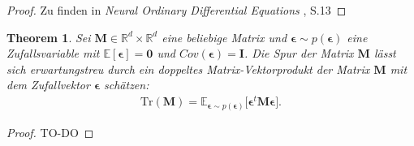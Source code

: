 \documentclass[12pt]{article}
\newcommand{\E}{\mathbb{E}}
\newtheorem{theorem}{Theorem}
\begin{document}
	\begin{proof}
	Zu finden in \emph{Neural Ordinary Differential Equations} \cite{neuralode}, S.13
	\end{proof}
		\begin{theorem}%
		Sei $\mathbf{M}\in \mathbb{R}^d \times \mathbb{R}^d$ eine beliebige Matrix und $\boldsymbol\epsilon \sim p(\boldsymbol\epsilon)$ eine Zufallsvariable mit $\E[\boldsymbol\epsilon] = \mathbf{0}$ und $Cov(\boldsymbol\epsilon) =\mathbf{I}$. Die Spur der Matrix $\mathbf{M}$ lässt sich erwartungstreu durch ein doppeltes Matrix-Vektorprodukt der Matrix  $\mathbf{M}$ mit dem Zufallvektor $\boldsymbol\epsilon$ schätzen:
		\begin{align*}
		\mathrm{Tr}(\mathbf{M}) = 
		\E_{\boldsymbol\epsilon \sim p(\boldsymbol\epsilon)}\big[\boldsymbol\epsilon^t \mathbf{M} \boldsymbol\epsilon \big].
		\end{align*}
	\end{theorem}
	\begin{proof}
		TO-DO %
	\end{proof}
	
\end{document}
